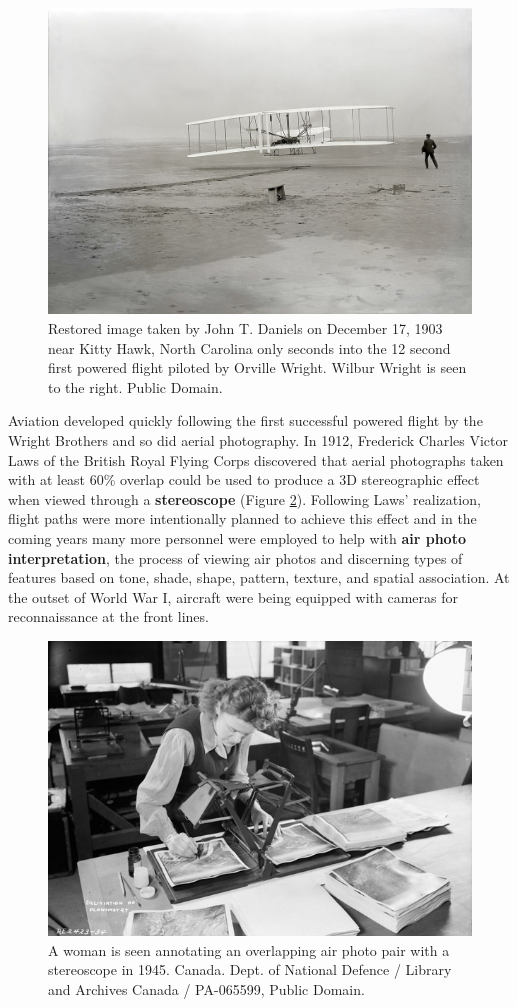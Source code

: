 \documentclass[
]{book}
\begin{document}
\begin{figure}
\includegraphics[width=0.75\linewidth]{images/01-wright-flyer} \caption{Restored image taken by John T. Daniels on December 17, 1903 near Kitty Hawk, North Carolina only seconds into the 12 second first powered flight piloted by Orville Wright. Wilbur Wright is seen to the right. Public Domain.}\label{fig:1-wright-flyer}
\end{figure}

Aviation developed quickly following the first successful powered flight by the Wright Brothers and so did aerial photography. In 1912, Frederick Charles Victor Laws of the British Royal Flying Corps discovered that aerial photographs taken with at least 60\% overlap could be used to produce a 3D stereographic effect when viewed through a \textbf{stereoscope} (Figure \ref{fig:1-woman-stereoscope}). Following Laws' realization, flight paths were more intentionally planned to achieve this effect and in the coming years many more personnel were employed to help with \textbf{air photo interpretation}, the process of viewing air photos and discerning types of features based on tone, shade, shape, pattern, texture, and spatial association. At the outset of World War I, aircraft were being equipped with cameras for reconnaissance at the front lines.

\begin{figure}
\includegraphics[width=0.75\linewidth]{images/01-woman-stereoscope} \caption{A woman is seen annotating an overlapping air photo pair with a stereoscope in 1945. Canada. Dept. of National Defence / Library and Archives Canada / PA-065599, Public Domain.}\label{fig:1-woman-stereoscope}
\end{figure}
\end{document}

